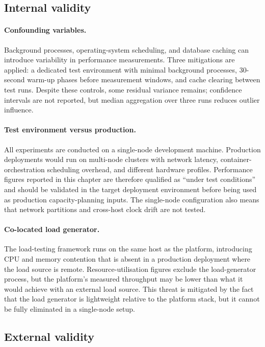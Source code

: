 \documentclass[a4paper]{sapthesis}
\begin{document}
\subsection{Internal validity}

\paragraph{Confounding variables.}
Background processes, operating-system scheduling, and database caching
can introduce variability in performance measurements.  Three mitigations
are applied: a dedicated test environment with minimal background
processes, 30-second warm-up phases before measurement windows, and
cache clearing between test runs.  Despite these controls, some residual
variance remains; confidence intervals are not reported, but median
aggregation over three runs reduces outlier influence.

\paragraph{Test environment versus production.}
All experiments are conducted on a single-node development machine.
Production deployments would run on multi-node clusters with network
latency, container-orchestration scheduling overhead, and different
hardware profiles.  Performance figures reported in this chapter are
therefore qualified as ``under test conditions'' and should be validated
in the target deployment environment before being used as production
capacity-planning inputs.  The single-node configuration also means that
network partitions and cross-host clock drift are not tested.

\paragraph{Co-located load generator.}
The load-testing framework runs on the same host as the platform,
introducing CPU and memory contention that is absent in a production
deployment where the load source is remote.  Resource-utilisation
figures exclude the load-generator process, but the platform's
measured throughput may be lower than what it would achieve with an
external load source.  This threat is mitigated by the fact that the
load generator is lightweight relative to the platform stack, but it
cannot be fully eliminated in a single-node setup.

\subsection{External validity}
\end{document}
